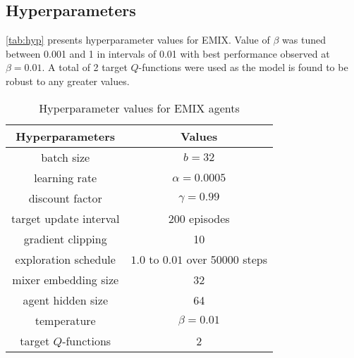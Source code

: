 \documentclass[11pt,letterpaper]{article}
\begin{document}
\subsection{Hyperparameters}
\autoref{tab:hyp} presents hyperparameter values for EMIX. Value of $\beta$ was tuned between 0.001 and 1 in intervals of 0.01 with best performance observed at $\beta=0.01$. A total of 2 target $Q$-functions were used as the model is found to be robust to any greater values.  
\begin{table}[!h]
    \centering
    \begin{tabular}{c|c}
         Hyperparameters & Values \\
         \hline
         batch size & $b=32$ \\
         learning rate & $\alpha=0.0005$ \\
         discount factor & $\gamma=0.99$ \\
         target update interval & 200 episodes \\
         gradient clipping & 10 \\
         exploration schedule & $1.0$ to $0.01$ over 50000 steps\\
         mixer embedding size & 32 \\
         agent hidden size & 64 \\
         temperature & $\beta=0.01$ \\
         target $Q$-functions & 2
    \end{tabular}
    \caption{Hyperparameter values for EMIX agents}
    \label{tab:hyp}
\end{table}
\end{document}

